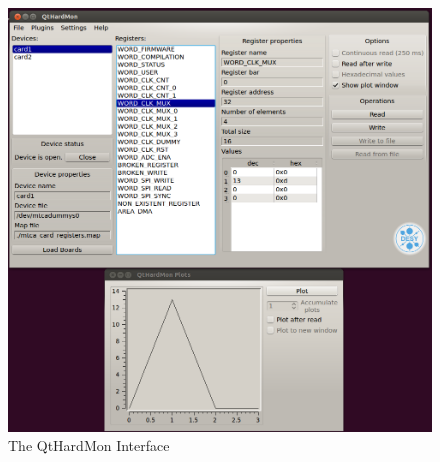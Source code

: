 \begin{figure}[htbp]
\centering
\includegraphics[width=1\textwidth]{images/explain_windows.png}
 \caption{The QtHardMon Interface}
\label{qthardmon_interface}
\end{figure}

